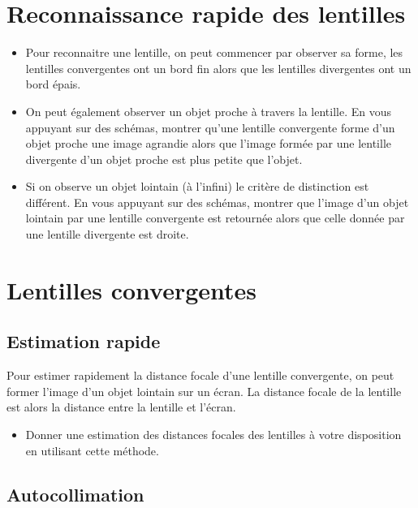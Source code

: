 \documentclass[a4paper]{tp}
\begin{document}
\section{Reconnaissance rapide des lentilles}%
\label{sec:reconnaissance_rapide_des_lentilles}
\begin{itemize}
  \item Pour reconnaitre une lentille, on peut commencer par observer sa forme, les lentilles convergentes ont un bord fin alors que les lentilles divergentes ont un bord épais.


\item On peut également observer un objet proche à travers la lentille. En vous appuyant sur des schémas, montrer qu'une lentille convergente forme d'un objet proche une image agrandie alors que l'image formée par une lentille divergente d'un objet proche est plus petite que l'objet.

\item Si on observe un objet lointain (à l'infini) le critère de distinction est différent. En vous appuyant sur des schémas, montrer que l'image d'un objet lointain par une lentille convergente est retournée alors que celle donnée par une lentille divergente est droite.
\end{itemize}

\section{Lentilles convergentes}%
\label{sec:lentilles_convergentes}

\subsection{Estimation rapide}%
\label{sub:estimation_rapide}

Pour estimer rapidement la distance focale d'une lentille convergente, on peut former l'image d'un objet lointain sur un écran. La distance focale de la lentille est alors la distance entre la lentille et l'écran.

\begin{itemize}
  \item Donner une estimation des distances focales des lentilles à votre disposition en utilisant cette méthode.
\end{itemize}


\subsection{Autocollimation}%
\end{document}
